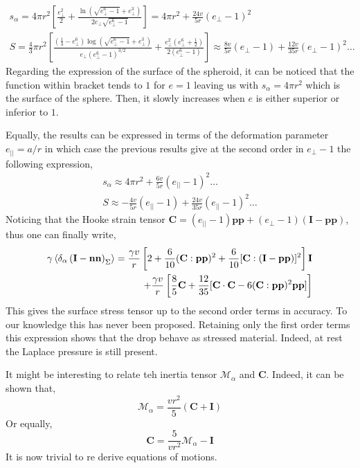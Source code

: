 \begin{align*}
    s_\alpha 
    = 4\pi r^2 \left[\frac{e_\bot^2}{2} + \frac{\ln\left(\sqrt{{e_\bot^6}-1}+{e_\bot^3}\right)}{2e_\bot\sqrt{e_\bot^6-1}}\right]
    = 4 \pi r^2 + \frac{24 v }{5 r} (e_\bot-1)^2\\
    S = \frac{4}{3} \pi r^2 \left[
    \frac{\left( \frac{1}{4} - e_\bot^6\right)  \log{\left( \sqrt{e_\bot^6-1}+{e_\bot^3}\right) } }
    { e_\bot  \left( e_\bot^6- 1\right)^{3/2} }
    +  \frac{e_\bot^2\left( e_\bot^6+  \frac{1}{2}\right)}{2\left( e_\bot^6- 1\right)}  \right]
    \approx 
    \frac{8 v}{5 r}(e_\bot-1) + \frac{12 v }{35r}(e_\bot-1)^2 \ldots
\end{align*}
Regarding the expression of the surface of the spheroid, it can be noticed that the function within bracket tends to $1$ for $e=1$ leaving us with $s_\alpha = 4\pi r^2$ which is the surface of the sphere. 
Then, it slowly increases when $e$ is either superior or inferior to $1$. 

Equally, the results can be expressed in terms of the deformation parameter $e_{||} = a/r$ in which case the previous results give at the second order in $e_\bot-1$ the following expression, 
\begin{align*}
    s_\alpha 
    \approx 4 \pi r^2 + \frac{6 v }{5 r} (e_{||}-1)^2 \ldots\\
    S 
    \approx 
    - \frac{4 v}{5 r}(e_{||}-1) + \frac{24 v }{35r}(e_{||}-1)^2 \ldots
\end{align*}
Noticing that the Hooke strain tensor $\textbf{C} = (e_{||}-1) \textbf{pp} + (e_\bot-1)(\textbf{I}- \textbf{pp})$, thus one can finally write,
\begin{align*}
    \gamma\left<\delta_\alpha \left( \textbf{I}-\textbf{nn} \right)_\Sigma\right>
    = \frac{\gamma v}{r} \left[
        2  + \frac{6 }{10 } (\textbf{C}:\textbf{pp})^2 + \frac{6 }{10 } [\textbf{C}:(\textbf{I}-\textbf{pp})]^2\right] \textbf{I}\\
        + \frac{\gamma v}{r} \left[ \frac{8}{5} \textbf{C}
        + \frac{12}{35}[\textbf{C}\cdot \textbf{C}- 6 (\textbf{C}:\textbf{pp})^2\textbf{pp}]
        \right]
\end{align*}
This gives the surface stress tensor up to the second order terms in accuracy. 
To our knowledge this has never been proposed. 
Retaining only the first order terms this expression shows that the drop behave as stressed material. 
Indeed, at rest the Laplace pressure is still present. 

It might be interesting to relate teh inertia tensor $\mathcal{M}_\alpha$ and \textbf{C}. 
Indeed, it can be shown that, 
\begin{equation}
    \mathcal{M}_\alpha
     = \frac{v r^2}{5}\left(\textbf{C} + \textbf{I}\right)
\end{equation}
Or equally, 
\begin{equation}
    \textbf{C}
     = \frac{5}{vr^2}\mathcal{M}_\alpha - \textbf{I}
\end{equation}
It is now trivial to re derive \citet{goddard1967nonlinear} equations of motions. 


